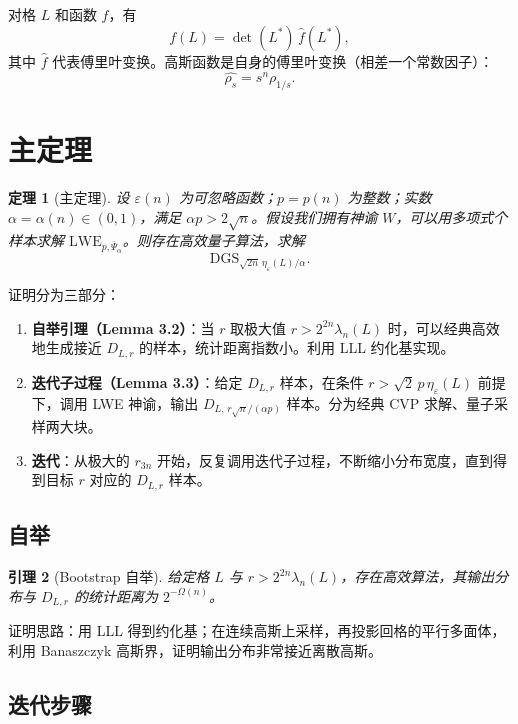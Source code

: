\documentclass[11pt,a4paper]{article}
\newtheorem{theorem}{定理}[section]
\newtheorem{lemma}[theorem]{引理}
\newcommand{\Psibar}{\overline{\Psi}}
\begin{document}
对格 $L$ 和函数 $f$，有
\[
  f(L)=\det(L^{*})\,\widehat{f}(L^{*}),
\]
其中 $\widehat{f}$ 代表傅里叶变换。高斯函数是自身的傅里叶变换（相差一个常数因子）：
\[
  \widehat{\rho_{s}}=s^{n}\rho_{1/s}.
\]

\section{主定理}

\begin{theorem}[主定理]
设 $\varepsilon(n)$ 为可忽略函数；$p=p(n)$ 为整数；实数 $\alpha=\alpha(n)\in(0,1)$，满足 $\alpha p>2\sqrt{n}$。假设我们拥有神谕 $W$，可以用多项式个样本求解 $\mathrm{LWE}_{p,\Psibar_{\alpha}}$。则存在高效量子算法，求解
\[
  \mathrm{DGS}_{\sqrt{2n}\,\eta_{\varepsilon}(L)/\alpha}.
\]
\end{theorem}

证明分为三部分：

\begin{enumerate}[label=\arabic*.]
  \item \textbf{自举引理（Lemma 3.2）}：当 $r$ 取极大值 $r>2^{2n}\lambda_{n}(L)$ 时，可以经典高效地生成接近 $D_{L,r}$ 的样本，统计距离指数小。利用 LLL 约化基实现。
  \item \textbf{迭代子过程（Lemma 3.3）}：给定 $D_{L,r}$ 样本，在条件 $r>\sqrt{2}\,p\,\eta_{\varepsilon}(L)$ 前提下，调用 LWE 神谕，输出 $D_{L,\,r\sqrt{n}/(\alpha p)}$ 样本。分为经典 CVP 求解、量子采样两大块。
  \item \textbf{迭代}：从极大的 $r_{3n}$ 开始，反复调用迭代子过程，不断缩小分布宽度，直到得到目标 $r$ 对应的 $D_{L,r}$ 样本。
\end{enumerate}

\subsection{自举}

\begin{lemma}[Bootstrap 自举]
给定格 $L$ 与 $r>2^{2n}\lambda_{n}(L)$，存在高效算法，其输出分布与 $D_{L,r}$ 的统计距离为 $2^{-\Omega(n)}$。
\end{lemma}

证明思路：用 LLL 得到约化基；在连续高斯上采样，再投影回格的平行多面体，利用 Banaszczyk 高斯界，证明输出分布非常接近离散高斯。

\subsection{迭代步骤}
\end{document}
